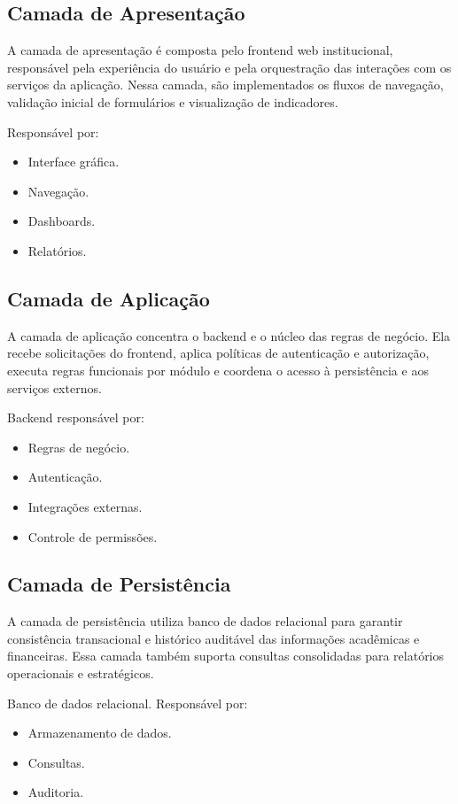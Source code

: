 \documentclass[12pt,a4paper]{article}
\begin{document}
\subsection{Camada de Apresentação}
A camada de apresentação é composta pelo frontend web institucional, responsável pela experiência do usuário e pela orquestração das interações com os serviços da aplicação. Nessa camada, são implementados os fluxos de navegação, validação inicial de formulários e visualização de indicadores.

Responsável por:
\begin{itemize}[leftmargin=*]
  \item Interface gráfica.
  \item Navegação.
  \item Dashboards.
  \item Relatórios.
\end{itemize}

\subsection{Camada de Aplicação}
A camada de aplicação concentra o backend e o núcleo das regras de negócio. Ela recebe solicitações do frontend, aplica políticas de autenticação e autorização, executa regras funcionais por módulo e coordena o acesso à persistência e aos serviços externos.

Backend responsável por:
\begin{itemize}[leftmargin=*]
  \item Regras de negócio.
  \item Autenticação.
  \item Integrações externas.
  \item Controle de permissões.
\end{itemize}

\subsection{Camada de Persistência}
A camada de persistência utiliza banco de dados relacional para garantir consistência transacional e histórico auditável das informações acadêmicas e financeiras. Essa camada também suporta consultas consolidadas para relatórios operacionais e estratégicos.

Banco de dados relacional. Responsável por:
\begin{itemize}[leftmargin=*]
  \item Armazenamento de dados.
  \item Consultas.
  \item Auditoria.
\end{itemize}
\end{document}
